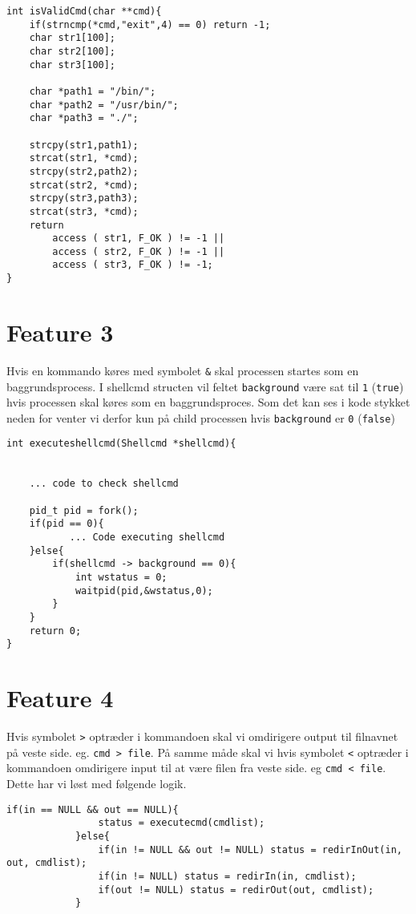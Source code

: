 \documentclass[danish]{report}
\begin{document}
\begin{lstlisting}
int isValidCmd(char **cmd){
    if(strncmp(*cmd,"exit",4) == 0) return -1;
    char str1[100];
    char str2[100];
    char str3[100];

    char *path1 = "/bin/";
    char *path2 = "/usr/bin/";
    char *path3 = "./";

    strcpy(str1,path1);
    strcat(str1, *cmd);
    strcpy(str2,path2);
    strcat(str2, *cmd);
    strcpy(str3,path3);
    strcat(str3, *cmd);
    return 
        access ( str1, F_OK ) != -1 || 
        access ( str2, F_OK ) != -1 || 
        access ( str3, F_OK ) != -1;
}
\end{lstlisting}


\section{Feature 3}

Hvis en kommando køres med symbolet {\tt \&} skal processen startes som en baggrundsprocess. I shellcmd structen vil feltet {\tt background} være sat til {\tt 1} ({\tt true}) hvis processen skal køres som en baggrundsproces. Som det kan ses i kode stykket neden for venter vi derfor kun på child processen hvis {\tt background} er {\tt 0} ({\tt false}) 
\begin{lstlisting}
int executeshellcmd(Shellcmd *shellcmd){
    

    ... code to check shellcmd

    pid_t pid = fork();
    if(pid == 0){
           ... Code executing shellcmd
    }else{
        if(shellcmd -> background == 0){
            int wstatus = 0;    
            waitpid(pid,&wstatus,0);
        }
    }
    return 0;
}
\end{lstlisting}

\section{Feature 4}

Hvis symbolet {\tt >} optræder i kommandoen skal vi omdirigere output til filnavnet på veste side. eg. {\tt cmd > file}. På samme måde skal vi hvis symbolet {\tt <} optræder i kommandoen omdirigere input til at være filen fra veste side. eg {\tt cmd < file}. Dette har vi løst med følgende logik.

\begin{lstlisting}
if(in == NULL && out == NULL){
                status = executecmd(cmdlist);
            }else{
                if(in != NULL && out != NULL) status = redirInOut(in, out, cmdlist);
                if(in != NULL) status = redirIn(in, cmdlist);
                if(out != NULL) status = redirOut(out, cmdlist);
            }
\end{lstlisting}
\end{document}
